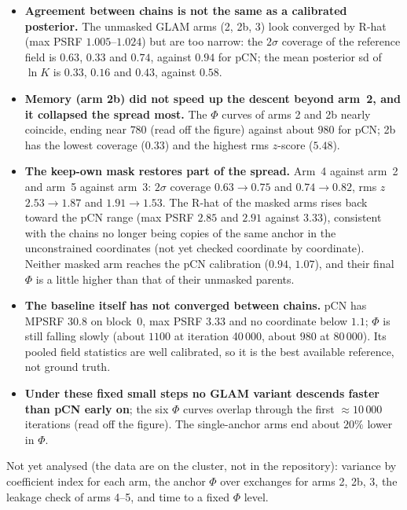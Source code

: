\documentclass[11pt]{article}
\begin{document}
\begin{itemize}
\item \textbf{Agreement between chains is not the same as a calibrated posterior.} The unmasked GLAM arms (2, 2b, 3) look converged by R-hat (max PSRF $1.005$--$1.024$) but are too narrow: the $2\sigma$ coverage of the reference field is $0.63$, $0.33$ and $0.74$, against $0.94$ for pCN; the mean posterior sd of $\ln K$ is $0.33$, $0.16$ and $0.43$, against $0.58$.
\item \textbf{Memory (arm 2b) did not speed up the descent beyond arm~2, and it collapsed the spread most.} The $\Phi$ curves of arms 2 and 2b nearly coincide, ending near $780$ (read off the figure) against about $980$ for pCN; 2b has the lowest coverage ($0.33$) and the highest rms $z$-score ($5.48$).
\item \textbf{The keep-own mask restores part of the spread.} Arm~4 against arm~2 and arm~5 against arm~3: $2\sigma$ coverage $0.63\to0.75$ and $0.74\to0.82$, rms $z$ $2.53\to1.87$ and $1.91\to1.53$. The R-hat of the masked arms rises back toward the pCN range (max PSRF $2.85$ and $2.91$ against $3.33$), consistent with the chains no longer being copies of the same anchor in the unconstrained coordinates (not yet checked coordinate by coordinate). Neither masked arm reaches the pCN calibration ($0.94$, $1.07$), and their final $\Phi$ is a little higher than that of their unmasked parents.
\item \textbf{The baseline itself has not converged between chains.} pCN has MPSRF $30.8$ on block~0, max PSRF $3.33$ and no coordinate below $1.1$; $\Phi$ is still falling slowly (about $1100$ at iteration 40\,000, about $980$ at 80\,000). Its pooled field statistics are well calibrated, so it is the best available reference, not ground truth.
\item \textbf{Under these fixed small steps no GLAM variant descends faster than pCN early on}; the six $\Phi$ curves overlap through the first $\approx 10\,000$ iterations (read off the figure). The single-anchor arms end about $20\%$ lower in $\Phi$.
\end{itemize}
Not yet analysed (the data are on the cluster, not in the repository): variance by coefficient index for each arm, the anchor $\Phi$ over exchanges for arms 2, 2b, 3, the leakage check of arms 4--5, and time to a fixed $\Phi$ level.
\end{document}

